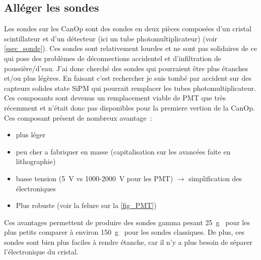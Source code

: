 \subsection{Alléger les sondes}
Les sondes sur les CanOp sont des sondes en deux pièces composées d'un cristal scintillateur et d'un détecteur (ici un tube photomultiplicateur) (voir \cref{ssec_sonde}). Ces sondes sont relativement lourdes et ne sont pas solidaires de ce qui pose des problèmes de déconnections accidentel et d'infiltration de poussière/d'eau. 
J'ai donc cherché des sondes qui pourraient être plus étanches et/ou plus légères. En faisant c'est rechercher je suis tombé par accident sur des capteurs solides state SiPM qui pourrait remplacer les tubes photomultiplicateur. Ces composants sont devenus un remplacement viable de PMT que très récemment et n'était donc pas disponibles pour la premiere vertion de la CanOp. Ces composant présent de nombreux avantage~:
\begin{itemize}
    \item plus léger
    \item peu cher a fabriquer en masse (capitalisation sur les avancées faite en lithographie)
    \item basse tension (5~V vs 1000-2000~V pour les PMT) $\rightarrow$ simplification des électroniques
    \item Plus robuste (voir la felure sur la \cref{fig_PMT})
\end{itemize}

Ces avantages permettent de produire des sondes gamma pesant 25~g~\cite{} pour les plus petits comparer à environ 150~g~\cite{} pour les sondes classiques. De plus, ces sondes sont bien plus faciles à rendre étanche, car il n'y a plus besoin de séparer l'électronique du cristal.
